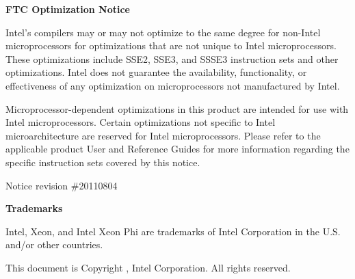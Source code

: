 \documentclass{book}
\begin{document}
\hypersetup{pageanchor=false,citecolor=blue}

{\bf FTC Optimization Notice}

Intel's compilers may or may not optimize to the same degree for non-Intel microprocessors for
optimizations that are not unique to Intel microprocessors. These optimizations include SSE2,
SSE3, and SSSE3 instruction sets and other optimizations. Intel does not guarantee the
availability, functionality, or effectiveness of any optimization on microprocessors not
manufactured by Intel.

Microprocessor-dependent optimizations in this product are intended for use with Intel
microprocessors. Certain optimizations not specific to Intel microarchitecture are reserved for
Intel microprocessors. Please refer to the applicable product User and Reference Guides for
more information regarding the specific instruction sets covered by this notice.

Notice revision \#20110804

\vspace*{0.5cm}

{\bf Trademarks}

Intel, Xeon, and Intel Xeon Phi are trademarks of Intel Corporation in the U.S. and/or other countries.

This document is Copyright , Intel Corporation. All rights reserved.

\tableofcontents
{}
\hypersetup{pageanchor=true,citecolor=blue}
\end{document}
